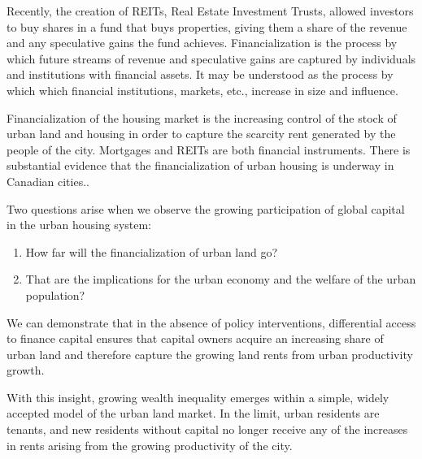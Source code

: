 Recently, the creation of REITs, Real Estate Investment Trusts, allowed investors to buy shares in a fund that buys properties, giving them a share of the revenue and any speculative gains the fund achieves.
Financialization is %
the process by which future streams of revenue and speculative gains are 
captured by individuals and institutions with financial assets. %
It may be understood as the process by which which financial institutions, markets, etc., increase in size and influence. 

Financialization of the housing market is the increasing control of the stock of urban land and housing in order to capture the scarcity rent generated by the people of the city.  Mortgages and REITs are both financial instruments.
There is substantial evidence that the financialization of urban housing is underway in Canadian cities..

Two questions arise when we observe the growing participation of global capital in the urban housing system: 
\begin{enumerate}
\item How far will the financialization of urban land go? 
\item That are the implications for the urban economy and the welfare of the urban population? 
\end{enumerate}

We can demonstrate that in the absence of policy interventions, differential access to finance capital ensures that capital owners acquire an increasing share of urban land %
and therefore capture the growing land rents from urban productivity growth. 

With this insight, growing wealth inequality emerges within a simple, widely accepted model of the urban land market. In the limit, urban residents are tenants, and new residents without capital no longer receive any of the increases in rents arising from the growing productivity of the city. 

